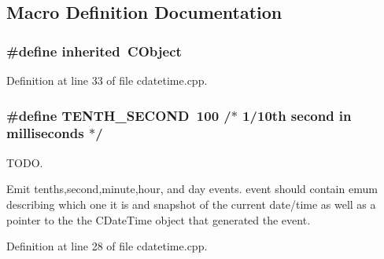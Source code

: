 \subsection{Macro Definition Documentation}
\subsubsection[{inherited}]{\setlength{\rightskip}{0pt plus 5cm}\#define inherited~C\-Object}\label{cdatetime_8cpp_a3920e3b7cb0909b941b2409493acf8f1}


Definition at line 33 of file cdatetime.\-cpp.

\subsubsection[{T\-E\-N\-T\-H\-\_\-\-S\-E\-C\-O\-N\-D}]{\setlength{\rightskip}{0pt plus 5cm}\#define T\-E\-N\-T\-H\-\_\-\-S\-E\-C\-O\-N\-D~100  /$\ast$ 1/10th second in milliseconds $\ast$/}\label{cdatetime_8cpp_a55ec6f6ba7f58ec046c46095a7f09133}


T\-O\-D\-O. 


\begin{DoxyItemize}
\item Emit tenths,second,minute,hour, and day events. event should contain emum describing which one it is and snapshot of the current date/time as well as a pointer to the the C\-Date\-Time object that generated the event. 
\end{DoxyItemize}

Definition at line 28 of file cdatetime.\-cpp.

